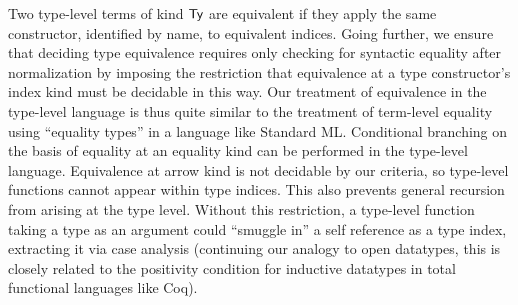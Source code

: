 Two type-level terms of kind $\textsf{Ty}$ are equivalent if they apply the same constructor, identified by name, to equivalent indices. Going further, we ensure that deciding type equivalence requires only checking for syntactic equality after normalization by imposing the restriction that equivalence at a type constructor's index kind must be decidable in this way. Our treatment of equivalence in the type-level language is thus quite similar to the treatment of term-level equality using ``equality types'' in a language like Standard ML.
Conditional branching on the basis of equality at an equality kind can be performed in the type-level language. Equivalence at arrow kind is not decidable by our criteria, so type-level functions cannot appear within type indices. This also prevents general recursion from arising at the type level. Without this restriction, a type-level function taking a type as an argument could ``smuggle in'' a self reference as a type index, extracting it via case analysis (continuing our analogy to open datatypes, this is closely related to the positivity condition for inductive datatypes in total functional languages like Coq).%

